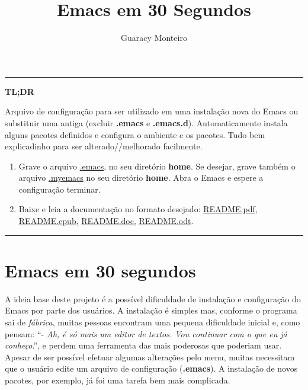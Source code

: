 \documentclass[]{article}
\title{Emacs em 30 Segundos}
\author{Guaracy Monteiro}
\date{}
\providecommand{\tightlist}{%
  \setlength{\itemsep}{0pt}\setlength{\parskip}{0pt}}
\begin{document}
\maketitle

{
\setcounter{tocdepth}{3}
\tableofcontents
}
\pagebreak

\begin{center}\rule{0.5\linewidth}{\linethickness}\end{center}

\textbf{TL;DR}

Arquivo de configuração para ser utilizado em uma instalação nova do
Emacs ou substituir uma antiga (excluir \textbf{.emacs} e
\textbf{.emacs.d}). Automaticamente instala alguns pacotes definidos e
configura o ambiente e os pacotes. Tudo bem explicadinho para ser
alterado//melhorado facilmente.

\begin{enumerate}
\tightlist
\item
  Grave o arquivo
  \href{https://raw.githubusercontent.com/guaracy/emacs/master/config/.emacs}{.emacs},
  no seu diretório \textbf{home}. Se desejar, grave também o arquivo
  \href{https://raw.githubusercontent.com/guaracy/emacs/master/config/.myemacs}{.myemacs}
  no seu diretório \textbf{home}. Abra o Emacs e espere a configuração
  terminar.
\item
  Baixe e leia a documentação no formato desejado:
  \href{https://raw.githubusercontent.com/guaracy/emacs/master/config/docs/README.pdf}{README.pdf},
  \href{https://raw.githubusercontent.com/guaracy/emacs/master/config/docs/README.epub}{README.epub},
  \href{https://raw.githubusercontent.com/guaracy/emacs/master/config/docs/README.docx}{README.doc},
  \href{https://raw.githubusercontent.com/guaracy/emacs/master/config/docs/README.odt}{README.odt}.
\end{enumerate}

\begin{center}\rule{0.5\linewidth}{\linethickness}\end{center}

\pagebreak

\section{Emacs em 30 segundos}\label{emacs-em-30-segundos}

A ideia base deste projeto é a possível dificuldade de instalação e
configuração do Emacs por parte dos usuários. A instalação é simples
mas, conforme o programa sai de \emph{fábrica}, muitas pessoas encontram
uma pequena dificuldade inicial e, como pensam: ``- \emph{Ah, é só mais
um editor de textos. Vou continuar com o que eu já conheço}.'', e perdem
uma ferramenta das mais poderosas que poderiam usar. Apesar de ser
possível efetuar algumas alterações pelo menu, muitas necessitam que o
usuário edite um arquivo de configuração (\textbf{.emacs}). A instalação
de novos pacotes, por exemplo, já foi uma tarefa bem mais complicada.
\end{document}
